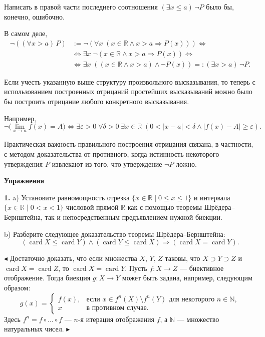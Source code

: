 Написать в правой части последнего соотношения $(\exists x \leqslant a)\, \neg P$ было бы,
конечно, ошибочно.

В самом деле,
\begin{align*}
  \neg ((\forall x > a)\, P) &:= \neg (\forall x\; (x \in \mathbb{R} \land x > a \Rightarrow P(x))) \Leftrightarrow \\
  &\Leftrightarrow \exists x\; \neg (x \in \mathbb{R} \land x > a \Rightarrow P(x)) \Leftrightarrow \\
  &\Leftrightarrow \exists x\; ((x \in \mathbb{R} \land x > a) \land \neg P(x)) =: (\exists x > a)\, \neg P.
\end{align*}

Если учесть указанную выше структуру произвольного высказывания, то
теперь с использованием построенных отрицаний простейших высказываний
можно было бы построить отрицание любого конкретного высказывания.

Например,
\[
  \neg \bigl(\lim_{x \to a} f(x) = A\bigr) \Leftrightarrow
  \exists \varepsilon > 0\; \forall \delta > 0\; \exists x \in \mathbb{R}\;
  (0 < |x - a| < \delta \land |f(x) - A| \geqslant \varepsilon).
\]

Практическая важность правильного построения отрицания связана, в
частности, с методом доказательства от противного, когда истинность
некоторого утверждения $P$ извлекают из того, что утверждение $\neg P$ ложно.

\bigskip

\textbf{Упражнения}

\medskip

\textbf{1.}\; a) Установите равномощность отрезка $\{x \in \mathbb{R} \mid 0 \leqslant x \leqslant 1\}$ и интервала
$\{x \in \mathbb{R} \mid 0 < x < 1\}$ числовой прямой $\mathbb{R}$ как с помощью теоремы Шрёдера--Берн\-штей\-на,
так и непосредственным предъявлением нужной биекции.

b) Разберите следующее доказательство теоремы Шрёдера--Берн\-штей\-на:
\[
  (\operatorname{card} X \leqslant \operatorname{card} Y) \land (\operatorname{card} Y \leqslant \operatorname{card} X) \Rightarrow
  (\operatorname{card} X = \operatorname{card} Y).
\]

$\blacktriangleleft$ \; Достаточно доказать, что если множества $X$, $Y$, $Z$ таковы, что $X \supset Y \supset Z$ и
$\operatorname{card} X = \operatorname{card} Z$, то $\operatorname{card} X = \operatorname{card} Y$. Пусть $f \colon X \to Z$ --- биективное отображение. Тогда биекция $g \colon X \to Y$ может быть задана, например, следующим образом:
\[
  g(x) = \begin{cases}
    f(x), & \text{если } x \in f^n(X) \setminus f^n(Y) \text{ для некоторого } n \in \mathbb{N}, \\
    x & \text{в противном случае.}
  \end{cases}
\]
Здесь $f^n = f \circ \ldots \circ f$ --- $n$-я итерация отображения $f$, а $\mathbb{N}$ --- множество натуральных
чисел. $\blacktriangleright$

